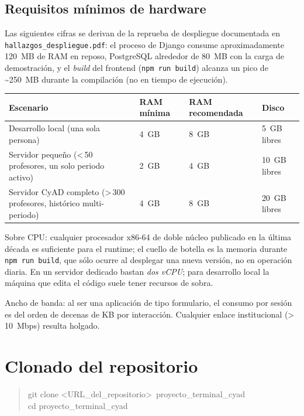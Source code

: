 \documentclass{computacion}
\begin{document}
\subsection{Requisitos mínimos de hardware}

Las siguientes cifras se derivan de la reprueba de despliegue documentada en \texttt{hallazgos\_despliegue.pdf}: el proceso de Django consume aproximadamente 120~MB de RAM en reposo, PostgreSQL alrededor de 80~MB con la carga de demostración, y el \emph{build} del frontend (\texttt{npm run build}) alcanza un pico de \textasciitilde 250~MB durante la compilación (no en tiempo de ejecución).

\begin{longtable}{p{} p{} p{} p{}}
    \toprule
    \textbf{Escenario} & \textbf{RAM mínima} & \textbf{RAM recomendada} & \textbf{Disco} \\
    \midrule
    \endhead
    Desarrollo local (una sola persona) & 4~GB & 8~GB & 5~GB libres \\
    \midrule
    Servidor pequeño (\textless\,50 profesores, un solo periodo activo) & 2~GB & 4~GB & 10~GB libres \\
    \midrule
    Servidor CyAD completo (\textgreater\,300 profesores, histórico multi-periodo) & 4~GB & 8~GB & 20~GB libres \\
    \bottomrule
\end{longtable}

Sobre CPU: cualquier procesador x86-64 de doble núcleo publicado en la última década es suficiente para el runtime; el cuello de botella es la memoria durante \texttt{npm run build}, que sólo ocurre al desplegar una nueva versión, no en operación diaria. En un servidor dedicado bastan \emph{dos vCPU}; para desarrollo local la máquina que edita el código suele tener recursos de sobra.

Ancho de banda: al ser una aplicación de tipo formulario, el consumo por sesión es del orden de decenas de KB por interacción. Cualquier enlace institucional (\textgreater\,10~Mbps) resulta holgado.

\section{Clonado del repositorio}

\begin{quote}
\ttfamily
git clone \textless URL\_del\_repositorio\textgreater\ proyecto\_terminal\_cyad \\
cd proyecto\_terminal\_cyad
\end{quote}
\end{document}
